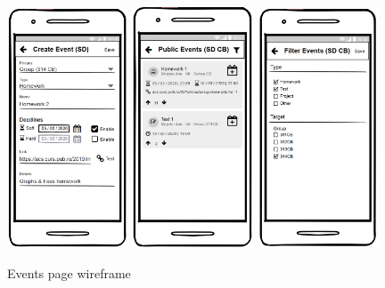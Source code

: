 \begin{figure}[!ht]
    \centering
     \includegraphics[width=0.32\textwidth]{figures/app/balsamiq/create_event.png}
     \hfill
     \includegraphics[width=0.32\textwidth]{figures/app/balsamiq/public_events.png}
     \hfill
     \includegraphics[width=0.32\textwidth]{figures/app/balsamiq/filter_events.png}
    \caption{Events page wireframe}
    \label{4:fig:balsamiq_events}
\end{figure}

